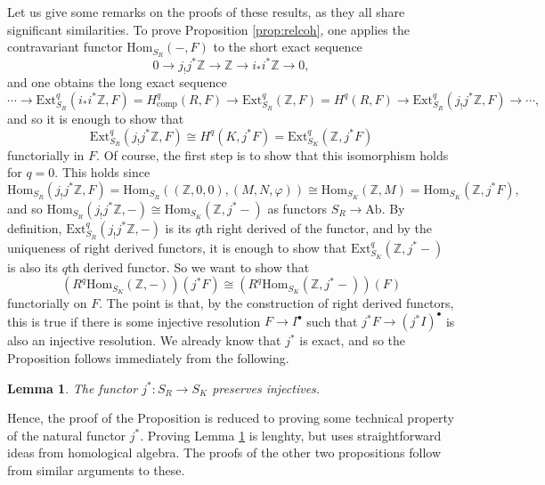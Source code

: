 \documentclass{article}
\newcommand{\Hom}{\mathrm{Hom}}
\newcommand{\ext}{\mathrm{Ext}}
\newcommand{\comp}{\mathrm{comp}}
\newcommand{\Ab}{\mathrm{Ab}}
\newcommand{\Z}{\mathbb{Z}}
\theoremstyle{plain}
\newtheorem{lemma}[theorem]{Lemma}
\theoremstyle{definition}
\begin{document}
    Let us give some remarks on the proofs of these results, as they all share significant similarities. To prove Proposition \ref{prop:relcoh}, one applies the contravariant functor $\Hom_{S_R}(-,F)$ to the short exact sequence 
    $$0\longrightarrow j_!j^*\Z\longrightarrow \Z\longrightarrow i_*i^*\Z\longrightarrow 0,$$
    and one obtains the long exact sequence
    $$\cdots\longrightarrow \ext_{S_R}^q(i_*i^*\Z,F)=H^q_{\comp}(R,F)\longrightarrow \ext_{S_R}^q(\Z,F)=H^q(R,F)\longrightarrow \ext_{S_R}^q(j_!j^*\Z,F)\longrightarrow\cdots,$$
    and so it is enough to show that 
    $$\ext_{S_R}^q(j_!j^*\Z,F)\cong H^q(K,j^*F)=\ext_{S_K}^q(\Z,j^*F)$$ 
    functorially in $F$. Of course, the first step is to show that this isomorphism holds for $q=0$. This holds since
    $$\Hom_{S_R}(j_!j^*\Z,F)=\Hom_{S_R}((\Z,0,0),(M,N,\varphi))\cong \Hom_{S_K}(\Z,M)=\Hom_{S_K}(\Z,j^*F),$$
    and so $\Hom_{S_R}(j_!j^*\Z,-)\cong\Hom_{S_K}(\Z,j^*-)$ as functors $S_R\to\Ab$. By definition, $\ext^q_{S_R}(j_!j^*\Z,-)$ is its $q$th right derived of the functor, and by the uniqueness of right derived functors, it is enough to show that $\ext^q_{S_K}(\Z,j^*-)$ is also its $q$th derived functor. So we want to show that 
    $$(R^q\Hom_{S_K}(\Z,-))(j^*F)\cong(R^q\Hom_{S_K}(\Z,j^*-))(F)$$
    functorially on $F$. The point is that, by the construction of right derived functors, this is true if there is some injective resolution $F\to I^\bullet$ such that $j^*F\to(j^*I)^\bullet$ is also an injective resolution. We already know that $j^*$ is exact, and so the Proposition follows immediately from the following.
    \begin{lemma}\label{lem:injectives}
        The functor $j^*:S_R\to S_K$ preserves injectives.
    \end{lemma}
    Hence, the proof of the Proposition is reduced to proving some technical property of the natural functor $j^*$. Proving Lemma \ref{lem:injectives} is lenghty, but uses straightforward ideas from homological algebra. The proofs of the other two propositions follow from similar arguments to these.
\end{document}
